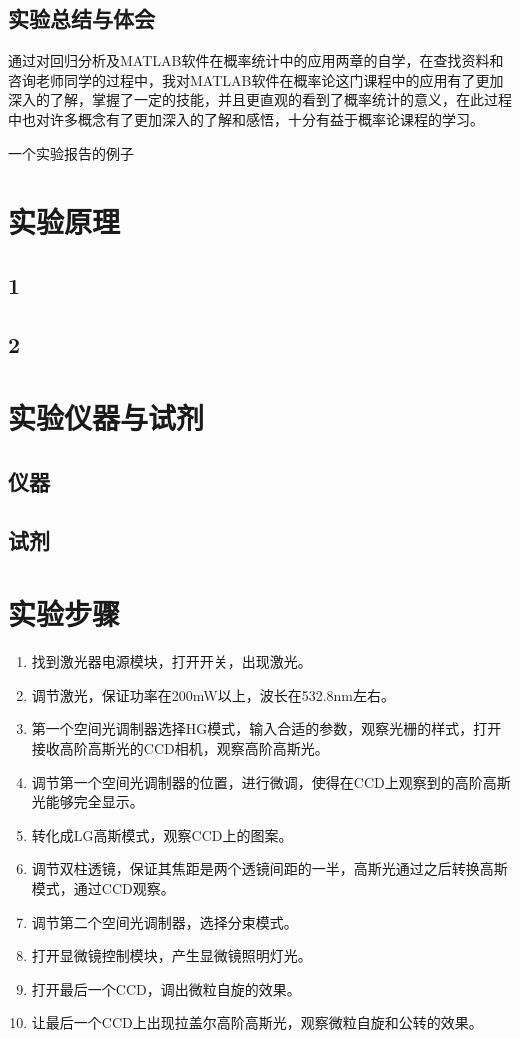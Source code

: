 \documentclass[UTF8,12pt,a4paper]{article}
\begin{document}
\subsection{实验总结与体会}
通过对回归分析及MATLAB软件在概率统计中的应用两章的自学，在查找资料和咨询老师同学的过程中，我对MATLAB软件在概率论这门课程中的应用有了更加深入的了解，掌握了一定的技能，并且更直观的看到了概率统计的意义，在此过程中也对许多概念有了更加深入的了解和感悟，十分有益于概率论课程的学习。

一个实验报告的例子


\section{实验原理}
\subsection{1}
\subsection{2}

\section{实验仪器与试剂}
\subsection{仪器}
\subsection{试剂}

\section{实验步骤}
\begin{enumerate}
	\item 找到激光器电源模块，打开开关，出现激光。
	\item 调节激光，保证功率在200mW以上，波长在532.8nm左右。
	\item 第一个空间光调制器选择HG模式，输入合适的参数，观察光栅的样式，打开接收高阶高斯光的CCD相机，观察高阶高斯光。
	\item 调节第一个空间光调制器的位置，进行微调，使得在CCD上观察到的高阶高斯光能够完全显示。
	\item 转化成LG高斯模式，观察CCD上的图案。
	\item 调节双柱透镜，保证其焦距是两个透镜间距的一半，高斯光通过之后转换高斯模式，通过CCD观察。
	\item 调节第二个空间光调制器，选择分束模式。
	\item 打开显微镜控制模块，产生显微镜照明灯光。
	\item 打开最后一个CCD，调出微粒自旋的效果。
	\item 让最后一个CCD上出现拉盖尔高阶高斯光，观察微粒自旋和公转的效果。
\end{enumerate}
\end{document}
